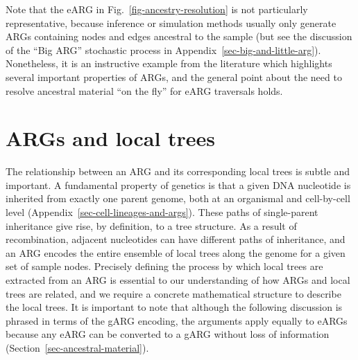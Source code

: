 \documentclass{article}
\begin{document}
Note that the \citet{wiuf1999recombination} eARG
in Fig.~\ref{fig-ancestry-resolution} is not particularly
representative, because inference or simulation methods usually
only generate ARGs containing nodes and edges ancestral to the sample
(but see the discussion of the ``Big ARG'' stochastic process in
Appendix~\ref{sec-big-and-little-arg}).
Nonetheless, it is an instructive example from the literature which highlights several
important properties of ARGs, and the general point about
the need to resolve ancestral material ``on the fly'' for eARG traversals
holds.

\section{ARGs and local trees}
\label{sec-ARG-and-local-trees}
The relationship between an ARG and its corresponding
local trees is subtle and important.
A fundamental property of genetics is that a
given DNA nucleotide is inherited from exactly one parent genome,
both at an organismal and cell-by-cell level
(Appendix~\ref{sec-cell-lineages-and-args}).
These paths of single-parent inheritance give rise,
by definition, to a tree structure.
As a result of recombination, adjacent nucleotides can have
different paths of inheritance, and
an ARG encodes the entire ensemble of local trees along the
genome for a given set of sample nodes.
Precisely defining the process by which local trees are extracted
from an ARG is essential to our understanding of how ARGs and local trees
are related, and we require a concrete mathematical structure
to describe the local trees. It is important to note that
although the following discussion is phrased in terms of the
gARG encoding,  the arguments apply equally to eARGs
because any eARG can be converted to a
gARG without loss of information (Section~\ref{sec-ancestral-material}).
\end{document}
